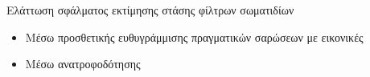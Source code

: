 \begin{frame}{Ελάττωση σφάλματος εκτίμησης στάσης φίλτρων σωματιδίων}


  \begin{itemize}
    \item Μέσω προσθετικής ευθυγράμμισης πραγματικών σαρώσεων με εικονικές
    \item Μέσω ανατροφοδότησης
  \end{itemize}


\end{frame}
